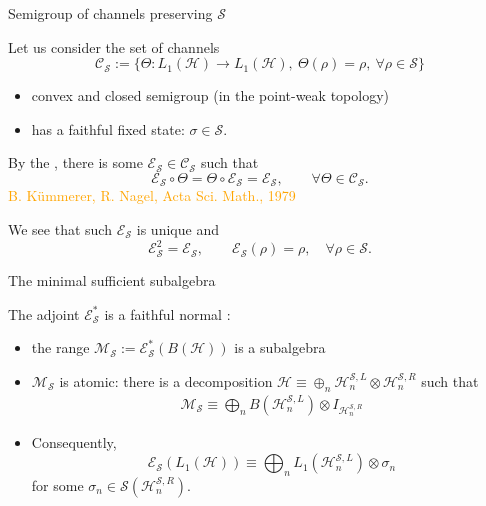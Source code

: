 \documentclass[mathserif]{beamer}
\newcommand{\<}{\langle}
\renewcommand{\>}{\rangle}
\newcommand{\Se}{\mathcal S}
\newcommand{\Ee}{\mathcal E}
\newcommand{\Me}{\mathcal M}
\newcommand{\Ce}{\mathcal C}
\newcommand{\Ha}{\mathcal H}
\begin{document}



\begin{frame}{Semigroup of channels preserving $\Se$}

Let us consider the set of channels 
\[
\Ce_\Se:=\{\Theta: L_1(\Ha)\to L_1(\Ha),\ \Theta(\rho)=\rho,\ \forall \rho\in \Se\}
\]

\begin{itemize}
\item convex and closed semigroup (in the point-weak topology)
\item has a faithful fixed state: $\sigma\in \Se$.
\end{itemize}

\medskip

By the , there is some  $\Ee_\Se\in \Ce_\Se$ such that
\[
\Ee_\Se\circ \Theta=\Theta\circ \Ee_\Se=\Ee_\Se,\qquad \forall \Theta\in \Ce_\Se.
\]%
{\footnotesize \textcolor{orange}{B. K\"ummerer, R. Nagel, Acta Sci. Math., 1979}}
\medskip

We see that such $\Ee_\Se$ is unique and
\[
 \Ee_\Se^2=\Ee_\Se,\qquad \Ee_\Se(\rho)=\rho,\quad \forall \rho\in \Se.
\]


\end{frame}


\begin{frame}{The minimal sufficient subalgebra}



The adjoint  $\Ee^*_\Se$ is a faithful  normal :

\medskip

\begin{itemize}

\item the range $\Me_\Se:= \Ee^*_\Se(B(\Ha))$ is a {subalgebra} 

\item $\Me_\Se$ is  atomic: there is a decomposition $\Ha\equiv\oplus_n
\Ha_n^{\Se,L}\otimes \Ha_n^{\Se,R}$ such that 
\begin{align*}
\Me_\Se \equiv \bigoplus_n B(\Ha_n^{\Se,L})\otimes I_{\Ha_n^{\Se,R}}
\end{align*}

\item Consequently, 
\[
\Ee_\Se(L_1(\Ha))\equiv \bigoplus_n L_1(\Ha_n^{\Se,L})\otimes \sigma_n
\]
for some     $\sigma_n\in \Se(\Ha_n^{\Se,R})$.

\end{itemize}


\end{frame}
\end{document}

